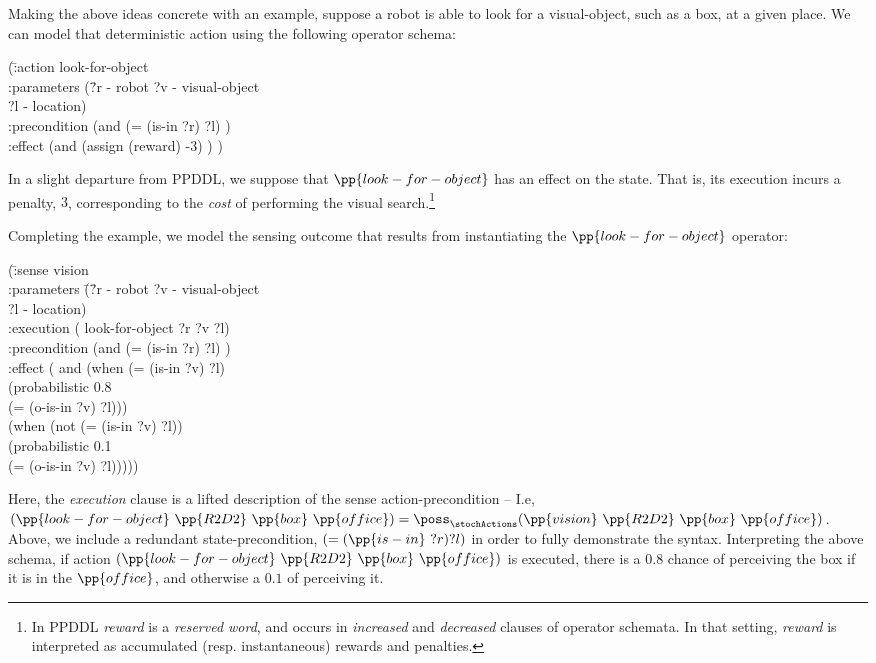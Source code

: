 Making the above ideas concrete with an example, suppose a robot is
able to look for a visual-object, such as a box, at a given place. We
can model that deterministic action using the following operator
schema:


\small
\begin{tabtt}
(\=:action look-for-object \+ \\
   :parameters (\=?r - robot ?v - visual-object\\
   \> ?l - location) \\
   :precondition (and (= (is-in ?r) ?l) ) \\
   :effect (and (assign (reward) -3) ) ) \\
\end{tabtt}
\normalsize


\noindent In a slight departure from PPDDL, we suppose that
$\pp{look-for-object}$ has an effect on the state. That is, its
execution incurs a penalty, $3$, corresponding to the {\em cost} of
performing the visual search.\footnote{In PPDDL {\em reward} is a {\em
reserved word}, and occurs in {\em increased} and {\em decreased}
clauses of operator schemata. In that setting, {\em reward} is
interpreted as accumulated (resp. instantaneous) rewards and
penalties.}

Completing the example, we model the sensing outcome that results from
instantiating the $\pp{look-for-object}$ operator:

\small
\begin{tabtt}
(\= :sense vision \+\\
 :parameters \= (\= ?r - robot ?v - visual-object\\
 \>\>  ?l - location) \\
 :execution \> ( \> look-for-object ?r ?v ?l) \\
 :precondition (and (= (is-in ?r) ?l) ) \\
 :effect \>  (  \> and (when (= (is-in ?v) ?l) \\
   \> \> (probabilistic 0.8 \\
   \>  \>(= (o-is-in ?v) ?l))) \\
  \> (when (not (= (is-in ?v) ?l)) \\
   \>  \> (probabilistic 0.1 \\
   \>  \> (= (o-is-in ?v) ?l))))) \\
\end{tabtt}
\normalsize


\noindent Here, the {\em execution} clause is a lifted description of
the sense action-precondition -- I.e,
$(\pp{look-for-object}~\pp{R2D2}~\pp{box}~\pp{office}) =
\poss_\stochActions(\pp{vision}~\pp{R2D2}~\pp{box}~\pp{office})$. Above,
we include a redundant state-precondition, $(=(\pp{is-in}~?r)?l)$ in
order to fully demonstrate the syntax. Interpreting the above schema,
if action $(\pp{look-for-object}~\pp{R2D2}~\pp{box}~\pp{office})$ is
executed, there is a $0.8$ chance of perceiving the box if it is in
the $\pp{office}$, and otherwise a $0.1$ of perceiving it.

